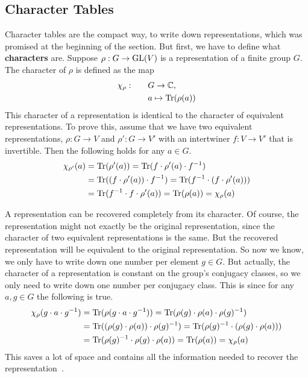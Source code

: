 \subsection{Character Tables}

Character tables are the compact way, to write down representations, which was promised at the beginning of the section.
But first, we have to define what \textbf{characters} are.
Suppose $\rho: G \to \operatorname{GL}(V)$ is a representation of a finite group $G$.
The character of $\rho$ is defined as the map
\begin{subequations}
    \begin{align}
        \chi_\rho: \qquad & G \to \mathbb{C}, \\
        & a \mapsto \operatorname{Tr}(\rho(a))
    \end{align}
\end{subequations}
This character of a representation is identical to the character of equivalent representations.
To prove this, assume that we have two equivalent representations, $\rho: G \to V$ and $\rho': G \to V'$ with an intertwiner $f: V \to V'$ that is invertible.
Then the following holds for any $a \in G$.
\begin{subequations}
\begin{align}
    \chi_{\rho'}(a) & = \operatorname{Tr}(\rho'(a)) = \operatorname{Tr}(f \cdot \rho'(a) \cdot f^{-1}) \\
    & = \operatorname{Tr}((f \cdot \rho'(a)) \cdot f^{-1}) = \operatorname{Tr}(f^{-1} \cdot (f \cdot \rho'(a))) \\
    & = \operatorname{Tr}(f^{-1} \cdot f \cdot \rho'(a) )= \operatorname{Tr}(\rho(a)) = \chi_\rho(a)
\end{align}
\end{subequations}

A representation can be recovered completely from its character.
Of course, the representation might not exactly be the original representation, since the character of two equivalent representations is the same.
But the recovered representation will be equivalent to the original representation.
So now we know, we only have to write down one number per element $g \in G$.
But actually, the character of a representation is constant on the group's conjugacy classes, so we only need to write down one number per conjugacy class.
This is since for any $a, g \in G$ the following is true.
\begin{subequations}
\begin{align}
    \chi_\rho(g \cdot a \cdot g^{-1}) & = \operatorname{Tr}(\rho(g \cdot a \cdot g^{-1})) = \operatorname{Tr}(\rho(g) \cdot \rho(a) \cdot \rho(g)^{-1}) \\
    & = \operatorname{Tr}((\rho(g) \cdot \rho(a)) \cdot \rho(g)^{-1}) = \operatorname{Tr}(\rho(g)^{-1} \cdot (\rho(g) \cdot \rho(a))) \\
    & = \operatorname{Tr}(\rho(g)^{-1} \cdot \rho(g) \cdot \rho(a)) = \operatorname{Tr}(\rho(a)) = \chi_\rho(a) \\
\end{align}
\end{subequations}
This saves a lot of space and contains all the information needed to recover the representation~\cite{fulton2013}.

